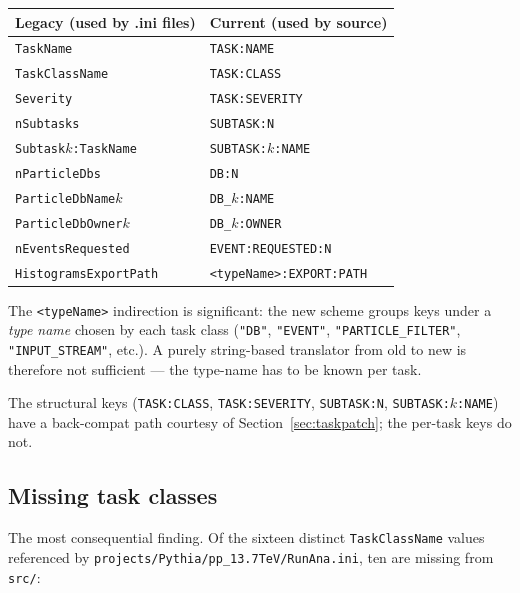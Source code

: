 \documentclass[11pt,a4paper]{article}
\begin{document}
\begin{center}\small
\begin{tabular}{ll}
\toprule
\textbf{Legacy (used by .ini files)} & \textbf{Current (used by source)} \\
\midrule
\texttt{TaskName}                 & \texttt{TASK:NAME} \\
\texttt{TaskClassName}            & \texttt{TASK:CLASS} \\
\texttt{Severity}                 & \texttt{TASK:SEVERITY} \\
\texttt{nSubtasks}                & \texttt{SUBTASK:N} \\
\texttt{Subtask$k$:TaskName}      & \texttt{SUBTASK:$k$:NAME} \\
\texttt{nParticleDbs}             & \texttt{DB:N} \\
\texttt{ParticleDbName$k$}        & \texttt{DB\_$k$:NAME} \\
\texttt{ParticleDbOwner$k$}       & \texttt{DB\_$k$:OWNER} \\
\texttt{nEventsRequested}         & \texttt{EVENT:REQUESTED:N} \\
\texttt{HistogramsExportPath}     & \texttt{<typeName>:EXPORT:PATH} \\
\bottomrule
\end{tabular}
\end{center}

\noindent
The \texttt{<typeName>} indirection is significant: the new scheme groups
keys under a \emph{type name} chosen by each task class
(\texttt{"DB"}, \texttt{"EVENT"}, \texttt{"PARTICLE\_FILTER"},
\texttt{"INPUT\_STREAM"}, etc.). A purely string-based translator from
old to new is therefore not sufficient --- the type-name has to be known
per task.

\noindent
The structural keys (\texttt{TASK:CLASS}, \texttt{TASK:SEVERITY},
\texttt{SUBTASK:N}, \texttt{SUBTASK:$k$:NAME}) have a back-compat path
courtesy of Section~\ref{sec:taskpatch}; the per-task keys do not.

\subsection{Missing task classes}

The most consequential finding. Of the sixteen distinct
\texttt{TaskClassName} values referenced by
\texttt{projects/Pythia/pp\_13.7TeV/RunAna.ini}, ten are missing from
\texttt{src/}:
\end{document}

